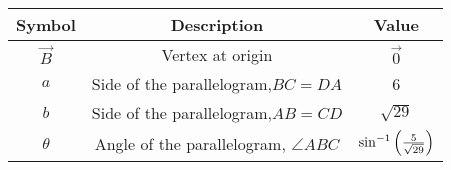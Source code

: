   \begin{tabular}{|c|c|c|}
    \hline
        \textbf{Symbol} &\textbf{Description}&\textbf{Value}  \\
        \hline
        $\vec{B}$&Vertex at origin&$\vec{0}$\\
        \hline
        $a$ & Side of the parallelogram,$BC=DA$ & 6\\
        \hline
        $b$ & Side of the parallelogram,$AB=CD$& $\sqrt{29}$\\
        \hline
        $\theta$ & Angle of the parallelogram, $\angle ABC$& $\sin^{-1}\left({\frac{5}{\sqrt{29}}}\right)$\\
        \hline
    \end{tabular}
